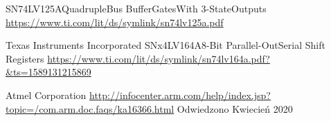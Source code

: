 \begin{thebibliography}{99}
        SN74LV125AQuadrupleBus BufferGatesWith 3-StateOutputs
        \url{https://www.ti.com/lit/ds/symlink/sn74lv125a.pdf}

        Texas Instruments Incorporated
        SNx4LV164A8-Bit Parallel-OutSerial Shift Registers
        \url{https://www.ti.com/lit/ds/symlink/sn74lv164a.pdf?&ts=1589131215869}

        Atmel Corporation
        \url{http://infocenter.arm.com/help/index.jsp?topic=/com.arm.doc.faqs/ka16366.html}
        Odwiedzono Kwiecień 2020

\end{thebibliography}

\newpage
        
\begin{appendices}


\end{appendices}
